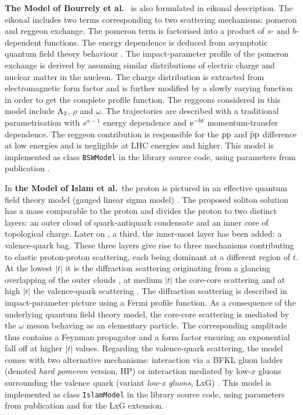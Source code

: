 \documentclass[preprint,12pt]{elsarticle}
\def\class#1{{\tt #1}}
\def\e{{\rm e}}
\begin{document}
{\bf The Model of Bourrely et al.}~\cite{bsw79,bsw84,bsw03,bsw11} is also formulated in eikonal description. The eikonal includes two terms corresponding to two scattering mechanisms: pomeron and reggeon exchange. The pomeron term is factorised into a product of $s$- and $b$-dependent functions. The energy dependence is deduced from asymptotic quantum field theory behaviour \cite{wu70}. The impact-parameter profile of the pomeron exchange is derived by assuming similar distributions of electric charge and nuclear matter in the nucleon. The charge distribution is extracted from electromagnetic form factor and is further modified by a slowly varying function in order to get the complete profile function. The reggeons considered in this model include $\rm A_2$, $\rho$ and $\omega$. The trajectories are described with a traditional parametrisation with $s^{\alpha - 1}$ energy dependence and $\e^{-bt}$ momentum-transfer dependence. The reggeon contribution is responsible for the $\rm pp$ and $\rm \bar pp$ difference at low energies and is negligible at LHC energies and higher. This model is implemented as class \class{BSWModel} in the library source code, using parameters from publication \cite{bsw03}.


 
In {\bf the Model of Islam et al.}~the proton is pictured in an effective quantum field theory model (gauged linear sigma model) \cite{islam06}. The proposed soliton solution has a mass comparable to the proton and divides the proton to two distinct layers: an outer cloud of quark-antiquark condensate and an inner core of topological charge. Later on \cite{islam05}, a third, the inner-most layer has been added: a valence-quark bag. These three layers give rise to three mechanisms contributing to elastic proton-proton scattering, each being dominant at a different region of $t$. At the lowest $|t|$ it is the diffraction scattering originating from a glancing overlapping of the outer clouds \cite{islam84,islam87}, at medium $|t|$ the core-core scattering \cite{islam06} and at high $|t|$ the valence-quark scattering \cite{islam05,islam09}. The diffraction scattering is described in impact-parameter picture using a Fermi profile function. As a consequence of the underlying quantum field theory model, the core-core scattering is mediated by the $\omega$ meson behaving as an elementary particle. The corresponding amplitude thus contains a Feynman propagator and a form factor ensuring an exponential fall off at higher $|t|$ values. Regarding the valence-quark scattering, the model comes with two alternative mechanisms: interaction via a BFKL gluon ladder (denoted {\em hard pomeron} version, HP) \cite{islam05} or interaction mediated by low-$x$ gluons surrounding the valence quark (variant {\em low-x gluons}, LxG) \cite{islam09}. This model is implemented as class \class{IslamModel} in the library source code, using parameters from publication \cite{islam06} and \cite{islam09} for the LxG extension.
\end{document}
